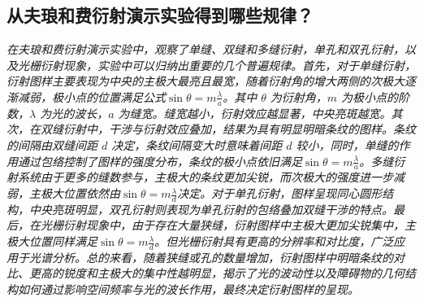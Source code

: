 \documentclass[UTF-8,twoside,cs4size]{ctexart}
\begin{document}
\subsection{从夫琅和费衍射演示实验得到哪些规律？}
\textit{在夫琅和费衍射演示实验中，观察了单缝、双缝和多缝衍射，单孔和双孔衍射，以及光栅衍射现象，实验中可以归纳出重要的几个普遍规律。首先，对于单缝衍射，衍射图样主要表现为中央的主极大最亮且最宽，随着衍射角的增大两侧的次极大逐渐减弱，极小点的位置满足公式$\sin \theta = m\frac{\lambda}{a}$。其中 \(\theta\) 为衍射角，\(m\) 为极小点的阶数，\(\lambda\) 为光的波长，\(a\) 为缝宽。缝宽越小，衍射效应越显著，中央亮斑越宽。其次，在双缝衍射中，干涉与衍射效应叠加，结果为具有明显明暗条纹的图样。条纹的间隔由双缝间距 \(d\) 决定，条纹间隔变大时意味着间距 \(d\) 较小，同时，单缝的作用通过包络控制了图样的强度分布，条纹的极小点依旧满足$\sin \theta = m\frac{\lambda}{a}$。多缝衍射系统由于更多的缝数参与，主极大的条纹更加尖锐，而次极大的强度进一步减弱，主极大位置依然由$\sin \theta = m\frac{\lambda}{d}$决定。对于单孔衍射，图样呈现同心圆形结构，中央亮斑明显，双孔衍射则表现为单孔衍射的包络叠加双缝干涉的特点。最后，在光栅衍射现象中，由于存在大量狭缝，衍射图样中主极大更加尖锐集中，主极大位置同样满足$\sin \theta = m\frac{\lambda}{d}$。但光栅衍射具有更高的分辨率和对比度，广泛应用于光谱分析。总的来看，随着狭缝或孔的数量增加，衍射图样中明暗条纹的对比、更高的锐度和主极大的集中性越明显，揭示了光的波动性以及障碍物的几何结构如何通过影响空间频率与光的波长作用，最终决定衍射图样的呈现。}
\end{document}
